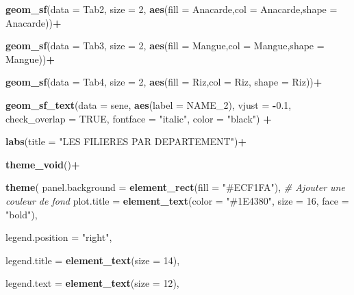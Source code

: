 \documentclass[
]{article}
\newenvironment{Shaded}{\begin{snugshade}}{\end{snugshade}}
\newcommand{\AttributeTok}[1]{\textcolor[rgb]{0.13,0.29,0.53}{#1}}
\newcommand{\CommentTok}[1]{\textcolor[rgb]{0.56,0.35,0.01}{\textit{#1}}}
\newcommand{\ConstantTok}[1]{\textcolor[rgb]{0.56,0.35,0.01}{#1}}
\newcommand{\DecValTok}[1]{\textcolor[rgb]{0.00,0.00,0.81}{#1}}
\newcommand{\FloatTok}[1]{\textcolor[rgb]{0.00,0.00,0.81}{#1}}
\newcommand{\FunctionTok}[1]{\textcolor[rgb]{0.13,0.29,0.53}{\textbf{#1}}}
\newcommand{\NormalTok}[1]{#1}
\newcommand{\SpecialCharTok}[1]{\textcolor[rgb]{0.81,0.36,0.00}{\textbf{#1}}}
\newcommand{\StringTok}[1]{\textcolor[rgb]{0.31,0.60,0.02}{#1}}
\begin{document}
\begin{Shaded}
\begin{Highlighting}[]
  \FunctionTok{geom\_sf}\NormalTok{(}\AttributeTok{data =}\NormalTok{ Tab2, }\AttributeTok{size =} \DecValTok{2}\NormalTok{, }\FunctionTok{aes}\NormalTok{(}\AttributeTok{fill =}\NormalTok{ Anacarde,}\AttributeTok{col =}\NormalTok{ Anacarde,}\AttributeTok{shape =}\NormalTok{ Anacarde))}\SpecialCharTok{+}
  
  \FunctionTok{geom\_sf}\NormalTok{(}\AttributeTok{data =}\NormalTok{ Tab3, }\AttributeTok{size =} \DecValTok{2}\NormalTok{, }\FunctionTok{aes}\NormalTok{(}\AttributeTok{fill =}\NormalTok{ Mangue,}\AttributeTok{col =}\NormalTok{ Mangue,}\AttributeTok{shape =}\NormalTok{ Mangue))}\SpecialCharTok{+}
  
  \FunctionTok{geom\_sf}\NormalTok{(}\AttributeTok{data =}\NormalTok{ Tab4, }\AttributeTok{size =} \DecValTok{2}\NormalTok{, }\FunctionTok{aes}\NormalTok{(}\AttributeTok{fill =}\NormalTok{ Riz,}\AttributeTok{col =}\NormalTok{ Riz, }\AttributeTok{shape =}\NormalTok{ Riz))}\SpecialCharTok{+}
  
  \FunctionTok{geom\_sf\_text}\NormalTok{(}\AttributeTok{data =}\NormalTok{ sene, }\FunctionTok{aes}\NormalTok{(}\AttributeTok{label =}\NormalTok{ NAME\_2),}
               \AttributeTok{vjust =} \SpecialCharTok{{-}}\FloatTok{0.1}\NormalTok{, }\AttributeTok{check\_overlap =} \ConstantTok{TRUE}\NormalTok{, }\AttributeTok{fontface =} \StringTok{"italic"}\NormalTok{, }\AttributeTok{color =} \StringTok{"black"}\NormalTok{) }\SpecialCharTok{+}
  
  \FunctionTok{labs}\NormalTok{(}\AttributeTok{title =} \StringTok{"LES FILIERES PAR DEPARTEMENT"}\NormalTok{)}\SpecialCharTok{+}
  
  \FunctionTok{theme\_void}\NormalTok{()}\SpecialCharTok{+}
  
   \FunctionTok{theme}\NormalTok{(}
    \AttributeTok{panel.background =} \FunctionTok{element\_rect}\NormalTok{(}\AttributeTok{fill =} \StringTok{"\#ECF1FA"}\NormalTok{),  }\CommentTok{\# Ajouter une couleur de fond}
    \AttributeTok{plot.title =} \FunctionTok{element\_text}\NormalTok{(}\AttributeTok{color =} \StringTok{"\#1E4380"}\NormalTok{, }\AttributeTok{size =} \DecValTok{16}\NormalTok{, }\AttributeTok{face =} \StringTok{"bold"}\NormalTok{),}
    
    \AttributeTok{legend.position =} \StringTok{"right"}\NormalTok{,}
    
    \AttributeTok{legend.title =} \FunctionTok{element\_text}\NormalTok{(}\AttributeTok{size =} \DecValTok{14}\NormalTok{),}
    
    \AttributeTok{legend.text =} \FunctionTok{element\_text}\NormalTok{(}\AttributeTok{size =} \DecValTok{12}\NormalTok{),}
    

\end{Highlighting}
\end{Shaded}
\end{document}
